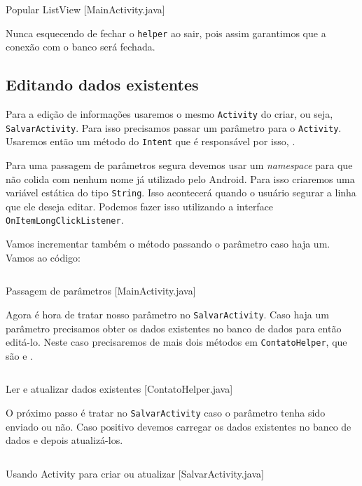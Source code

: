 \begin{listing}[H]
  \inputminted[linenos=true,frame=bottomline,tabsize=3]{ java }{ source/MainActivity-6.java }
  \caption{Popular ListView [MainActivity.java]}
\end{listing}

Nunca esquecendo de fechar o \texttt{helper} ao sair, pois assim garantimos que a conexão com
o banco será fechada.

\subsection{Editando dados existentes}

Para a edição de informações usaremos o mesmo \texttt{Activity} do criar, ou seja, \texttt{SalvarActivity}.
Para isso precisamos passar um parâmetro para o \texttt{Activity}. Usaremos então um método do
\texttt{Intent} que é responsável por isso, .

Para uma passagem de parâmetros segura devemos usar um \textit{namespace} para que não colida com
nenhum nome já utilizado pelo Android. Para isso criaremos uma variável estática do tipo \texttt{String}.
Isso acontecerá quando o usuário segurar a linha que ele deseja editar. Podemos fazer isso utilizando
a interface \texttt{OnItemLongClickListener}.

Vamos incrementar também o método  passando o parâmetro caso haja um. Vamos ao
código:

\begin{listing}[H]
  \inputminted[linenos=true,frame=bottomline,tabsize=3]{ java }{ source/MainActivity-7.java }
  \caption{Passagem de parâmetros [MainActivity.java]}
\end{listing}

Agora é hora de tratar nosso parâmetro no \texttt{SalvarActivity}. Caso haja um parâmetro precisamos
obter os dados existentes no banco de dados para então editá-lo. Neste caso precisaremos de mais dois
métodos em \texttt{ContatoHelper}, que são  e .

\begin{listing}[H]
  \inputminted[linenos=true,frame=bottomline,tabsize=3]{ java }{ source/ContatoHelper-4.java }
  \caption{Ler e atualizar dados existentes [ContatoHelper.java]}
\end{listing}

O próximo passo é tratar no \texttt{SalvarActivity} caso o parâmetro tenha sido enviado ou não. Caso positivo
devemos carregar os dados existentes no banco de dados e depois atualizá-los.

\begin{listing}[H]
  \inputminted[linenos=true,frame=bottomline,tabsize=3]{ java }{ source/SalvarActivity-3.java }
  \caption{Usando Activity para criar ou atualizar [SalvarActivity.java]}
\end{listing}